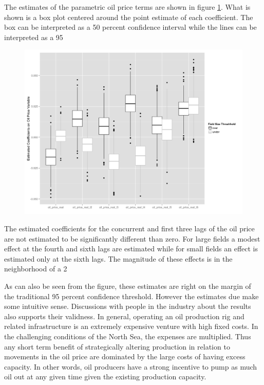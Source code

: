 \documentclass[12pt]{scrartcl} %
\begin{document}
The estimates of the parametric oil price terms are shown in figure \ref{gam_price_dirty_box}.  What is shown is a box plot centered around the point estimate of each coefficient.  The box can be interpreted as a 50 percent confidence interval while the lines can be interpreted as a 95%

\begin{figure}
	\includegraphics[width=.8\textwidth]{gam_price_dirty_box.png}
	\caption{}
	\label{gam_price_dirty_box}
\end{figure}

The estimated coefficients for the concurrent and first three lags of the oil price are not estimated to be significantly different than zero.  For large fields a modest effect at the fourth and sixth lags are estimated while for small fields an effect is estimated only at the sixth lags. The magnitude of these effects is in the neighborhood of a 2%

As can also be seen from the figure, these estimates are right on the margin of the traditional 95 percent confidence threshold.  However the estimates due make some intuitive sense.  Discussions with people in the industry about the results also supports their validness.  In general, operating an oil production rig and related infrastructure is an extremely expensive venture with high fixed costs.  In the challenging conditions of the North Sea, the expenses are multiplied.  Thus any short term benefit of strategically altering production in relation to movements in the oil price are dominated by the large costs of having excess capacity.  In other words, oil producers have a strong incentive to pump as much oil out at any given time given the existing production capacity.  
\end{document}
